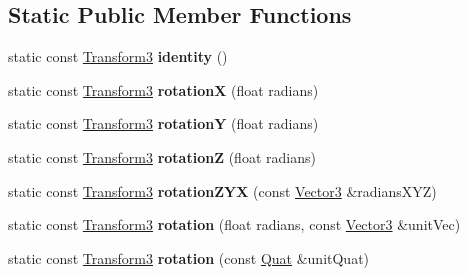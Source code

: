 \subsection*{Static Public Member Functions}
\begin{DoxyCompactItemize}
\item 
\mbox{\label{classVectormath_1_1Aos_1_1Transform3_ade2ab6bc76576386a76e14264f75fdf5}} 
static const \hyperlink{classVectormath_1_1Aos_1_1Transform3}{Transform3} {\bfseries identity} ()
\item 
\mbox{\label{classVectormath_1_1Aos_1_1Transform3_a704c79773d3152c81f89c4559baf9c04}} 
static const \hyperlink{classVectormath_1_1Aos_1_1Transform3}{Transform3} {\bfseries rotationX} (float radians)
\item 
\mbox{\label{classVectormath_1_1Aos_1_1Transform3_a94b0d26cde5a0c51cee484de6908e126}} 
static const \hyperlink{classVectormath_1_1Aos_1_1Transform3}{Transform3} {\bfseries rotationY} (float radians)
\item 
\mbox{\label{classVectormath_1_1Aos_1_1Transform3_ac937cd488a09d971d401ba69a73bcfaa}} 
static const \hyperlink{classVectormath_1_1Aos_1_1Transform3}{Transform3} {\bfseries rotationZ} (float radians)
\item 
\mbox{\label{classVectormath_1_1Aos_1_1Transform3_a6ffd290b9f03f13493e1d026bdb2d441}} 
static const \hyperlink{classVectormath_1_1Aos_1_1Transform3}{Transform3} {\bfseries rotation\+Z\+YX} (const \hyperlink{classVectormath_1_1Aos_1_1Vector3}{Vector3} \&radians\+X\+YZ)
\item 
\mbox{\label{classVectormath_1_1Aos_1_1Transform3_a67eea08ba0db05580bb2504aa52b40df}} 
static const \hyperlink{classVectormath_1_1Aos_1_1Transform3}{Transform3} {\bfseries rotation} (float radians, const \hyperlink{classVectormath_1_1Aos_1_1Vector3}{Vector3} \&unit\+Vec)
\item 
\mbox{\label{classVectormath_1_1Aos_1_1Transform3_ab2d837a6fafb99eb8557d4d72d91dfa5}} 
static const \hyperlink{classVectormath_1_1Aos_1_1Transform3}{Transform3} {\bfseries rotation} (const \hyperlink{classVectormath_1_1Aos_1_1Quat}{Quat} \&unit\+Quat)

\end{DoxyCompactItemize}

